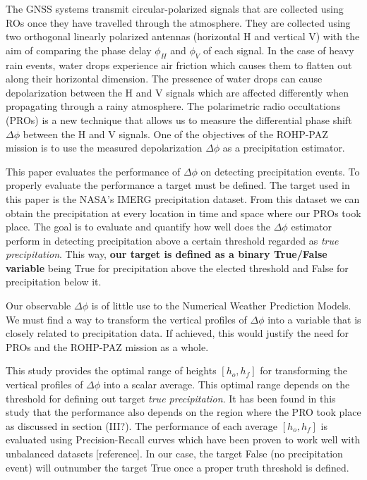 \documentclass[twocolumn]{revtex4}
\begin{document}
The GNSS systems transmit circular-polarized signals that are collected 
using ROs once they have travelled through the atmosphere. 
They are collected using two orthogonal linearly polarized antennas 
(horizontal H and vertical V) with the aim of comparing the phase
delay $\phi_H$ and $\phi_V$ of each signal. In the case of heavy rain events,
water drops experience
air friction which causes them to flatten out along their horizontal 
dimension. The pressence of water drops can cause depolarization
between the H and V signals which are affected differently when 
propagating through a rainy atmosphere. The polarimetric radio occultations (PROs) is a 
new technique that allows us to measure the differential phase shift $\Delta \phi$
between the H and V signals. One of the objectives of 
the ROHP-PAZ mission is to use the measured depolarization $\Delta \phi$ 
as a precipitation estimator.

This paper evaluates the performance of $\Delta \phi$  on 
detecting precipitation events. To properly evaluate the performance 
a target must be defined. The target used in this paper
is the NASA's IMERG precipitation dataset. From this dataset we can obtain 
the precipitation at every location in time and space where our 
PROs took place. The goal is to evaluate and quantify how well does 
the $\Delta \phi$ estimator perform in detecting precipitation above a certain
threshold regarded as {\it true precipitation}. This way, {\bf our target 
is defined as a binary True/False variable} being True for precipitation
above the elected threshold and False for precipitation below it. 

Our observable $\Delta \phi$ is of little use to the Numerical Weather
Prediction Models. We must find a way to transform the vertical profiles
of $\Delta \phi$ into a variable that is closely related to 
precipitation data. If achieved, this would justify the need for PROs and 
the ROHP-PAZ mission as a whole. 

This study provides the optimal range of heights 
$[h_o, h_f]$ for transforming the vertical profiles of $\Delta\phi$ into a scalar 
average. This optimal range depends on the threshold for defining out target {\it true precipitation}.
It has been found in this study that the performance also depends 
on the region where the PRO took place as discussed in section (III?). 
The performance of each average $[h_o, h_f]$ is evaluated
using Precision-Recall curves which have been proven to 
work well with unbalanced datasets [reference]. In our case, the target
False (no precipitation event) will outnumber the target True once a proper
truth threshold is defined. 
\end{document}
